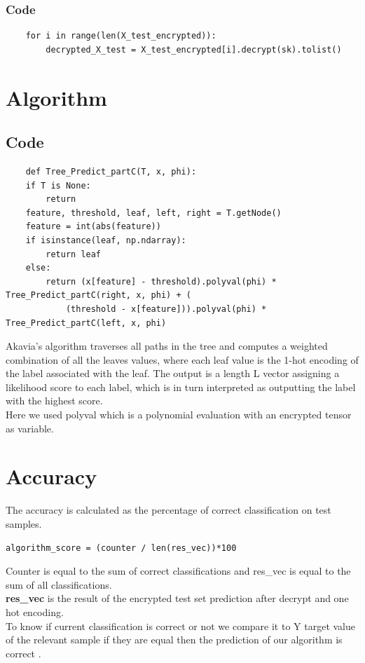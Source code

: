 \documentclass[11pt]{article}
\begin{document}
\subsubsection{Code}
\begin{lstlisting}
    for i in range(len(X_test_encrypted)):
        decrypted_X_test = X_test_encrypted[i].decrypt(sk).tolist()
\end{lstlisting}


\section{Algorithm}
\subsection{Code}
\begin{lstlisting}
    def Tree_Predict_partC(T, x, phi):
    if T is None:
        return
    feature, threshold, leaf, left, right = T.getNode()
    feature = int(abs(feature))
    if isinstance(leaf, np.ndarray):
        return leaf
    else:
        return (x[feature] - threshold).polyval(phi) * Tree_Predict_partC(right, x, phi) + (
            (threshold - x[feature])).polyval(phi) * Tree_Predict_partC(left, x, phi)
\end{lstlisting}
Akavia's algorithm traverses all paths in the tree and computes a weighted combination of all the leaves values, where each leaf value is the 1-hot encoding of the label associated with the leaf. The output is a length L vector assigning a likelihood score to each label, which is in turn interpreted as outputting the label with the highest score.\\
Here we used polyval which is a polynomial evaluation with an encrypted tensor as variable.

\section{Accuracy}
The accuracy is calculated as the percentage of correct classification on test samples. \\
\begin{lstlisting}
algorithm_score = (counter / len(res_vec))*100 
\end{lstlisting}
Counter is equal to the sum of correct classifications and res\_vec is equal to the sum of all classifications.\\ 
\textbf{res\_vec} is the result of the encrypted test set prediction after decrypt and one hot encoding.\\
To know if current classification is correct or not we compare it to Y target value of the relevant sample if they are equal then the prediction of our algorithm is correct . \\
\end{document}
